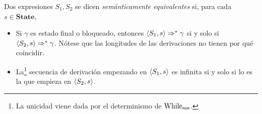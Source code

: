 \begin{definition}
Dos expresiones $S_1, S_2$ se dicen \textit{semánticamente equivalentes} si, para cada $s \in \mathbf{State}$, 
\begin{itemize}
    \item Si $\gamma$ es estado final o bloqueado, entonces $\langle S_1, s \rangle\Rightarrow^* \gamma$ si y solo si $\langle S_2, s \rangle \Rightarrow^*\gamma$. Nótese que las longitudes de las derivaciones no tienen por qué coincidir.
    \item La\footnote{La unicidad viene dada por el determinismo de $\mathrm{While}_{\mathrm{sos}}$.} secuencia de derivación empezando en $\langle S_1, s \rangle$ es infinita si y solo si lo es la que empieza en $\langle S_2, s \rangle$.
\end{itemize} 
\end{definition}